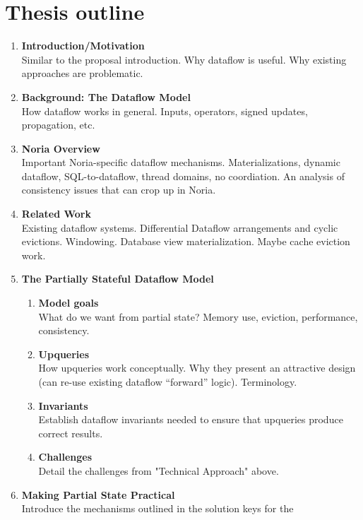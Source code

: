 \documentclass[12pt,letterpaper,twoside]{article}
\begin{document}
\section{Thesis outline}

\begin{enumerate}

 \item \textbf{Introduction/Motivation}\\
   Similar to the proposal introduction. Why dataflow is useful. Why
   existing approaches are problematic.
 \item \textbf{Background: The Dataflow Model}\\
   How dataflow works in general. Inputs, operators, signed updates,
   propagation, etc.
 \item \textbf{Noria Overview}\\
   Important Noria-specific dataflow mechanisms. Materializations,
   dynamic dataflow, SQL-to-dataflow, thread domains, no coordiation.
   An analysis of consistency issues that can crop up in Noria.
 \item \textbf{Related Work}\\
   Existing dataflow systems. Differential Dataflow arrangements and
   cyclic evictions. Windowing. Database view materialization. Maybe
   cache eviction work.
 \item \textbf{The Partially Stateful Dataflow Model}
   \begin{enumerate}
   \item \textbf{Model goals}\\
     What do we want from partial state? Memory use, eviction,
     performance, consistency.
   \item \textbf{Upqueries}\\
     How upqueries work conceptually. Why they present an attractive
     design (can re-use existing dataflow ``forward'' logic). Terminology.
   \item \textbf{Invariants}\\
     Establish dataflow invariants needed to ensure that upqueries
     produce correct results.
   \item \textbf{Challenges}\\
     Detail the challenges from "Technical Approach" above.
   \end{enumerate}
 \item \textbf{Making Partial State Practical}\\
   Introduce the mechanisms outlined in the solution keys for the

\end{enumerate}
\end{document}

